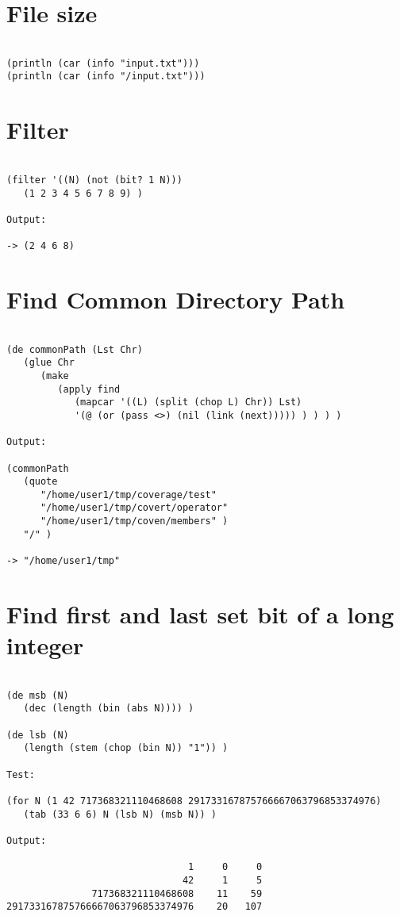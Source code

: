 \section*{File size}

\begin{verbatim}

(println (car (info "input.txt")))
(println (car (info "/input.txt")))

\end{verbatim}

\section*{Filter}

\begin{verbatim}

(filter '((N) (not (bit? 1 N)))
   (1 2 3 4 5 6 7 8 9) )

Output:

-> (2 4 6 8)

\end{verbatim}

\section*{Find Common Directory Path}

\begin{verbatim}

(de commonPath (Lst Chr)
   (glue Chr
      (make
         (apply find
            (mapcar '((L) (split (chop L) Chr)) Lst)
            '(@ (or (pass <>) (nil (link (next))))) ) ) ) )

Output:

(commonPath
   (quote
      "/home/user1/tmp/coverage/test"
      "/home/user1/tmp/covert/operator"
      "/home/user1/tmp/coven/members" )
   "/" )

-> "/home/user1/tmp"

\end{verbatim}

\section*{Find first and last set bit of a long integer}

\begin{verbatim}

(de msb (N)
   (dec (length (bin (abs N)))) )

(de lsb (N)
   (length (stem (chop (bin N)) "1")) )

Test:

(for N (1 42 717368321110468608 291733167875766667063796853374976)
   (tab (33 6 6) N (lsb N) (msb N)) )

Output:

                                1     0     0
                               42     1     5
               717368321110468608    11    59
291733167875766667063796853374976    20   107

\end{verbatim}

